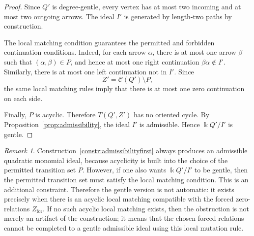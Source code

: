 \documentclass[11pt]{article}
\newcommand{\K}{\Bbbk}
\theoremstyle{plain}
\theoremstyle{definition}
\theoremstyle{remark}
\newtheorem{remark}[theorem]{Remark}
\begin{document}
\begin{proof}
Since \(Q'\) is degree-gentle, every vertex has at most two incoming and at
most two outgoing arrows.  The ideal \(I'\) is generated by length-two paths by
construction.

The local matching condition guarantees the permitted and forbidden
continuation conditions.  Indeed, for each arrow \(\alpha\), there is at most
one arrow \(\beta\) such that \((\alpha,\beta)\in P\), and hence at most one
right continuation \(\beta\alpha\notin I'\).  Similarly, there is at most one
left continuation not in \(I'\).  Since
\[
  Z'=\mathcal C(Q')\setminus P,
\]
the same local matching rules imply that there is at most one zero
continuation on each side.

Finally, \(P\) is acyclic.  Therefore \(T(Q',Z')\) has no oriented cycle.  By
Proposition~\ref{prop:admissibility}, the ideal \(I'\) is admissible.  Hence
\(\K Q'/I'\) is gentle.
\end{proof}

\begin{remark}
Construction~\ref{constr:admissibilityfirst} always produces an admissible
quadratic monomial ideal, because acyclicity is built into the choice of the
permitted transition set \(P\).  
However, if one also wants \(\K Q'/I'\) to be gentle, then the permitted
transition set must satisfy the local matching condition.  This is an
additional constraint.  Therefore the gentle version is not automatic: it
exists precisely when there is an acyclic local matching compatible with the
forced zero-relations \(Z_{\mathrm{for}}\).  If no such acyclic local matching
exists, then the obstruction is not merely an artifact of the construction; it
means that the chosen forced relations cannot be completed to a gentle
admissible ideal using this local mutation rule.
\end{remark}
\end{document}
